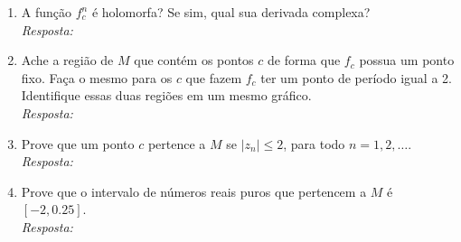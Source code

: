 \begin{enumerate}[label=(\alph*)]
    \item A função \( f_c^n \) é holomorfa? Se sim, qual sua derivada complexa? \\
    \textit{Resposta: }

    \item Ache a região de \( M \) que contém os pontos \( c \) de forma que \( f_c \) possua um ponto fixo. Faça o mesmo para os \( c \) que fazem \( f_c \) ter um ponto de período igual a 2. Identifique essas duas regiões em um mesmo gráfico. \\
    \textit{Resposta: }

    \item Prove que um ponto \( c \) pertence a \( M \) se \( |z_n| \leq 2 \), para todo \( n = 1, 2, \ldots \). \\
    \textit{Resposta: }

    \item Prove que o intervalo de números reais puros que pertencem a \( M \) é \( [-2, 0.25] \). \\
    \textit{Resposta: }
\end{enumerate}
